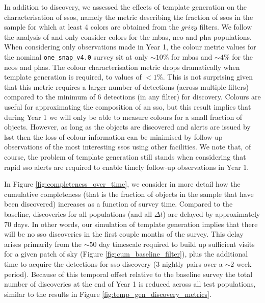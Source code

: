 \documentclass[preprintm,linenumbers]{aastex631}
\newcommand{\baseline}{\texttt{one\_snap\_v4.0}\xspace}
\begin{document}
  		In addition to discovery, we assessed the effects of template generation on the characterisation of \glspl*{sso}, namely the metric describing the fraction of \glspl*{sso} in the sample for which at least 4 colors are obtained from the $grizy$ filters.
		We follow the analysis of \cite{schwambTuningLegacySurvey2023} and only consider colors for the \glspl*{mba}, \gls*{neo} and \gls*{pha} populations.
When considering only observations made in Year 1, the colour metric values for the nominal \baseline survey sit at only $\sim10\%$ for \glspl*{mba} and $\sim4\%$ for the \glspl*{neo} and \glspl*{pha}.
  The colour characterisation metric drops dramatically when template generation is required, to values of $<1\%$.
This is not surprising given that this metric requires a larger number of detections (across multiple filters) compared to the minimum of 6 detections (in any filter) for discovery.
  Colours are useful for approximating the composition of an \gls*{sso}, but this result implies that during Year 1 we will only be able to measure colours for a small fraction of objects.
  However, as long as the objects are discovered and alerts are issued by \gls*{lsst} then the loss of colour information can be minimised by follow-up observations of the most interesting \glspl*{sso} using other facilities.
  We note that, of course, the problem of template generation still stands when considering that rapid \gls*{sso} alerts are required to enable timely follow-up observations in Year 1. 
		
		In Figure \ref{fig:completeness_over_time}, we consider in more detail how the cumulative completeness (that is the fraction of objects in the sample that have been discovered) increases as a function of survey time.
  Compared to the baseline, discoveries for all populations (and all $\Delta t$) are delayed by approximately 70 days.
  In other words, our simulation of template generation implies that there will be no \gls*{sso} discoveries in the first couple months of the survey.
  This delay arises primarily from the $\sim 50$ day timescale required to build up sufficient visits for a given patch of sky (Figure \ref{fig:cum_baseline_filter}), plus the additional time to acquire the detections for \gls*{sso} discovery (3 nightly pairs over a $\sim 2$ week period).
  Because of this temporal offset relative to the baseline survey the total number of discoveries at the end of Year 1 is reduced across all test populations, similar to the results in Figure \ref{fig:temp_gen_discovery_metrics}.
  
\end{document}
